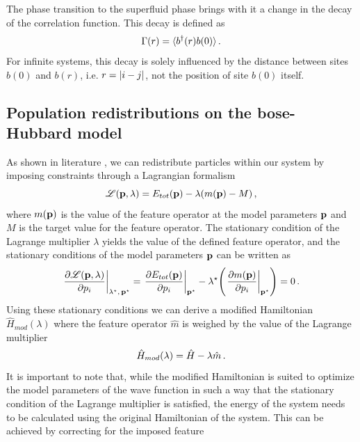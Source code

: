 \documentclass[twoside,twocolumn,9pt]{article}
\begin{document}
The phase transition to the superfluid phase brings with it a change in the decay of the correlation function. This decay is defined as
\begin{equation}\label{eq:correlation decay}
  \Gamma(r) = \langle b^\dagger(r)b(0)\rangle \thinspace .
\end{equation}
For infinite systems, this decay is solely influenced by the distance between sites $b(0)$ and $b(r)$, i.e. $r = \abs{i-j}$, not the position of site $b(0)$ itself.

\subsection{Population redistributions on the bose-Hubbard model}
As shown in literature \cite{devriendt2021, devriendt2022}, we can redistribute particles within our system by imposing constraints through a Lagrangian formalism \cite{mukherji1963, zeiss1983, kaduk2011}
\begin{equation}
  \mathscr{L}(\vb{p}, \lambda)
        = E_{tot}(\vb{p})
        - \lambda ( m(\vb{p}) - M )
        \thinspace ,
\end{equation} 
where $m(\vb{p})$ is the value of the feature operator at the model parameters $\vb{p}$ and $M$ is the target value for the feature operator. The stationary condition of the Lagrange multiplier $\lambda$ yields the value of the defined feature operator, and the stationary conditions of the model parameters $\vb{p}$ can be written as
\begin{equation}
  \eval{
    \pdv{
        \mathscr{L}(\vb{p}, \lambda)
    }{p_i}
}_{\lambda^\star, \thinspace \vb{p}^\star}
= \eval{
    \pdv{
        E_{tot}(\vb{p})
    }{p_i}
}_{\vb{p}^\star}
- \lambda^\star \qty( 
    \eval{
        \pdv{
            m(\vb{p})
        }{p_i}
    }_{\vb{p}^\star}
)
= 0
\thinspace .
\label{eq:stationary_condition_model_parameters}
\end{equation}
Using these stationary conditions we can derive a modified Hamiltonian $\hat{H}_{mod}(\lambda)$ where the feature operator $\hat{m}$ is weighed by the value of the Lagrange multiplier
\begin{equation}
  \hat{H}_{mod}(\lambda) = \hat{H} - \lambda \hat{m} \thinspace .
  \label{eq:modified-hamiltonian}
\end{equation}
It is important to note that, while the modified Hamiltonian is suited to optimize the model parameters of the wave function in such a way that the stationary condition of the Lagrange multiplier is satisfied, the energy of the system needs to be calculated using the original Hamiltonian of the system. This can be achieved by correcting for the imposed feature
\end{document}
